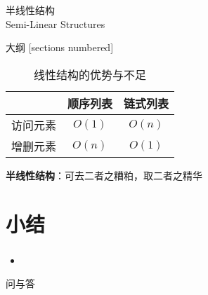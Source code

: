 \begin{standout}[第二章]
    半线性结构\\
    Semi-Linear Structures
\end{standout}

\begin{frame}{大纲}
    [sections numbered]
    \tableofcontents
\end{frame}

\begin{frame}
    \begin{table}
        \small
        \label{tab:linear_structures_disadvantages}
        \caption{线性结构的优势与不足}
        \begin{tabular}{rcc}
            \toprule
            & \textbf{顺序列表} & \textbf{链式列表} \\
            \midrule
            访问元素 & $O(1)$ & $O(n)$ \\
            增删元素 & $O(n)$ & $O(1)$ \\
            \bottomrule
        \end{tabular}
    \end{table}
    \pause
    \centering
    \textbf{半线性结构}：可去二者之糟粕，取二者之精华
\end{frame}

% 
% 


\section{小结}

\begin{frame}
    \frametitle{\insertsectionhead}
    \begin{itemize}
        \item 
    \end{itemize}
\end{frame}

\begin{standout}[]
    问与答
\end{standout}